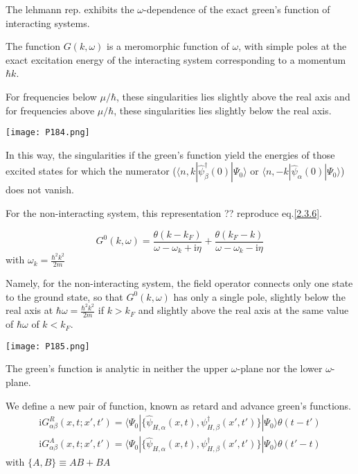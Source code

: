 ﻿\documentclass[twoside]{book}
\numberwithin{equation}{section}
\begin{document}
The lehmann rep. exhibits the $\omega$-dependence of the exact green's function of interacting systems.

The function $G(k,\omega)$ is a meromorphic function of $\omega$, with simple poles at the exact excitation energy of the interacting system corresponding to a momentum $\hbar k$.

For frequencies below $\mu/\hbar$, these singularities lies slightly above the real axis and for frequencies above $\mu/\hbar$, these singularities  lies slightly below the real axis.

\begin{center}
\texttt{[image: P184.png]}
\end{center}
In this way, the singularities if the green's function yield the energies of those excited states for which the numerator ($\langle n,k|\hat \psi^{
\dagger}_{\beta} (0)|\Psi_0\rangle$ or $\langle n,-k|\hat \psi_{\alpha}(0)|\Psi_0\rangle$) does not vanish. 

For the non-interacting system, this representation ?? reproduce eq.\ref{2.3.6}.

\begin{equation}
G^0(k,\omega)=\frac{\theta(k-k_F)}{\omega-\omega_k+\mathrm{i}\eta}+\frac{\theta(k_F-k)}{\omega-\omega_k-\mathrm{i}\eta} \nonumber
\end{equation} 
with $\omega_k=\frac{\hbar^2k^2}{2m}$

Namely, for the non-interacting system, the field operator connects only one state to the ground state, so that $G^0(k,\omega)$ has only a single pole, slightly below the real axis at $\hbar \omega=\frac{\hbar^2k^2}{2m}$ if $k>k_F$ and slightly above the real axis at the same value of $\hbar \omega$ of $k<k_F$.


\begin{center}
\texttt{[image: P185.png]}
\end{center}

The green's function is analytic in neither the upper $\omega$-plane nor the lower $\omega$-plane.

We define a new pair of function, known as retard and advance green's functions.
\begin{align}\label{2.3.13}
\mathrm{i}G^R_{\alpha\beta}(x,t;x',t')=\langle \Psi_0|\{\hat \psi_{H,\alpha}(x,t),\psi^{\dagger}_{H,\beta}(x',t')\}|\Psi_0\rangle\theta(t-t')
\end{align}
\begin{align}\label{2.3.14}
\mathrm{i}G^A_{\alpha\beta}(x,t;x',t')=\langle \Psi_0|\{\hat \psi_{H,\alpha}(x,t),\psi^{\dagger}_{H,\beta}(x',t')\}|\Psi_0\rangle\theta(t'-t)
\end{align}
with $\{A,B\}\equiv AB+BA$
\end{document}
